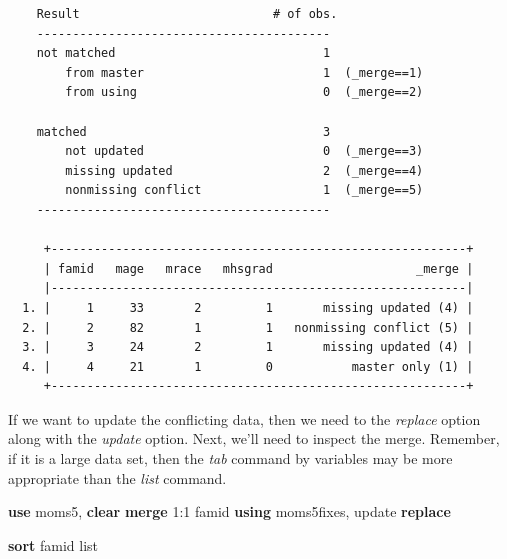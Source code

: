 \documentclass[
]{book}
\newenvironment{Shaded}{\begin{snugshade}}{\end{snugshade}}
\newcommand{\KeywordTok}[1]{\textcolor[rgb]{0.13,0.29,0.53}{\textbf{#1}}}
\newcommand{\NormalTok}[1]{#1}
\newcommand{\OtherTok}[1]{\textcolor[rgb]{0.56,0.35,0.01}{#1}}
\begin{document}
\begin{verbatim}
    Result                           # of obs.
    -----------------------------------------
    not matched                             1
        from master                         1  (_merge==1)
        from using                          0  (_merge==2)

    matched                                 3
        not updated                         0  (_merge==3)
        missing updated                     2  (_merge==4)
        nonmissing conflict                 1  (_merge==5)
    -----------------------------------------

     +----------------------------------------------------------+
     | famid   mage   mrace   mhsgrad                    _merge |
     |----------------------------------------------------------|
  1. |     1     33       2         1       missing updated (4) |
  2. |     2     82       1         1   nonmissing conflict (5) |
  3. |     3     24       2         1       missing updated (4) |
  4. |     4     21       1         0           master only (1) |
     +----------------------------------------------------------+
\end{verbatim}

If we want to update the conflicting data, then we need to the \emph{replace} option along with the \emph{update} option. Next, we'll need to inspect the merge. Remember, if it is a large data set, then the \emph{tab} command by variables may be more appropriate than the \emph{list} command.

\begin{Shaded}
\begin{Highlighting}[]
\KeywordTok{use}\NormalTok{ moms5, }\KeywordTok{clear}
\KeywordTok{merge}\NormalTok{ 1:1 famid }\KeywordTok{using}\NormalTok{ moms5fixes, update }\KeywordTok{replace}

\KeywordTok{sort}\NormalTok{ famid}
\OtherTok{list}
\end{Highlighting}
\end{Shaded}
\end{document}
